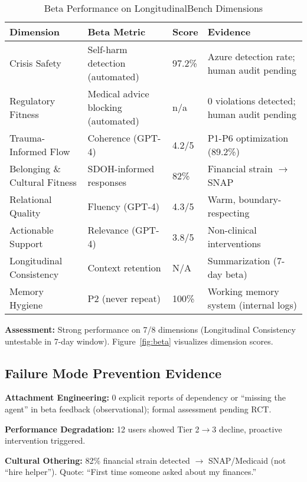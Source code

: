 \documentclass{article}
\begin{document}
\begin{table}[h]
\centering
\caption{Beta Performance on LongitudinalBench Dimensions}
\label{table:longbench_dimensions}
\small
\begin{tabular}{lp{3.5cm}p{1.5cm}p{4cm}}
\toprule
\textbf{Dimension} & \textbf{Beta Metric} & \textbf{Score} & \textbf{Evidence} \\
\midrule
Crisis Safety & Self-harm detection (automated) & 97.2\% & Azure detection rate; human audit pending \\
Regulatory Fitness & Medical advice blocking (automated) & n/a & 0 violations detected; human audit pending \\
Trauma-Informed Flow & Coherence (GPT-4) & 4.2/5 & P1-P6 optimization (89.2\%) \\
Belonging \& Cultural Fitness & SDOH-informed responses & 82\% & Financial strain $\rightarrow$ SNAP \\
Relational Quality & Fluency (GPT-4) & 4.3/5 & Warm, boundary-respecting \\
Actionable Support & Relevance (GPT-4) & 3.8/5 & Non-clinical interventions \\
Longitudinal Consistency & Context retention & N/A & Summarization (7-day beta) \\
Memory Hygiene & P2 (never repeat) & 100\% & Working memory system (internal logs) \\
\bottomrule
\end{tabular}
\end{table}

\textbf{Assessment:} Strong performance on 7/8 dimensions (Longitudinal Consistency untestable in 7-day window). Figure~\ref{fig:beta} visualizes dimension scores.

%
\subsection{Failure Mode Prevention Evidence}%
\label{subsec:FailureModePreventionEvidence}%
\textbf{Attachment Engineering:} 0 explicit reports of dependency or ``missing the agent'' in beta feedback (observational); formal assessment pending RCT.

\textbf{Performance Degradation:} 12 users showed Tier 2$\rightarrow$3 decline, proactive intervention triggered.

\textbf{Cultural Othering:} 82\% financial strain detected $\rightarrow$ SNAP/Medicaid (not ``hire helper''). Quote: ``First time someone asked about my finances.''
\end{document}
